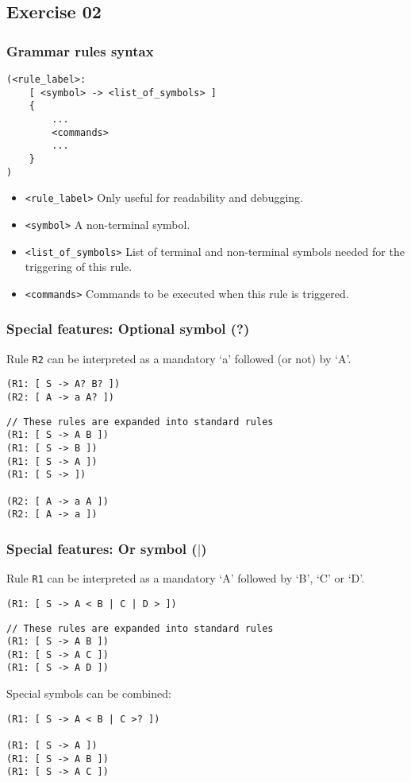 \documentclass[11pt]{beamer}
\begin{document}
\subsection{Exercise 02}

\begin{frame}[fragile]
\frametitle{Grammar rules syntax}
\begin{lstlisting}[language=lekta]
(<rule_label>:
	[ <symbol> -> <list_of_symbols> ]
	{
		...
		<commands>
		...
	}
)
\end{lstlisting}
\pause
\begin{itemize}
	\item \texttt{<rule\_label>} Only useful for readability and debugging.
	\item \texttt{<symbol>} A non-terminal symbol.
	\item \texttt{<list\_of\_symbols>} List of terminal and non-terminal symbols needed for the triggering of this rule.
	\item \texttt{<commands>} Commands to be executed  when this rule is triggered.
\end{itemize}
\end{frame}

\begin{frame}[fragile]
\frametitle{Special features: Optional symbol (?)}
\small
Rule \texttt{R2} can be interpreted as a mandatory `a' followed (or not) by `A'.
\begin{lstlisting}[language=lekta]
(R1: [ S -> A? B? ])
(R2: [ A -> a A? ])
\end{lstlisting}
\pause
\begin{lstlisting}[language=lekta]
// These rules are expanded into standard rules
(R1: [ S -> A B ])
(R1: [ S -> B ])
(R1: [ S -> A ])
(R1: [ S -> ])

(R2: [ A -> a A ])
(R2: [ A -> a ])
\end{lstlisting}
\end{frame}

\begin{frame}[fragile]
\frametitle{Special features: Or symbol ($|$)}
\small
Rule \texttt{R1} can be interpreted as a mandatory `A' followed by `B', `C' or `D'.
\begin{lstlisting}[language=lekta]
(R1: [ S -> A < B | C | D > ])
\end{lstlisting}
\pause
\begin{lstlisting}[language=lekta]
// These rules are expanded into standard rules
(R1: [ S -> A B ])
(R1: [ S -> A C ])
(R1: [ S -> A D ])
\end{lstlisting}
\vspace{15pt}
\pause
Special symbols can be combined:
\begin{lstlisting}[language=lekta]
(R1: [ S -> A < B | C >? ])

(R1: [ S -> A ])
(R1: [ S -> A B ])
(R1: [ S -> A C ])
\end{lstlisting}
\end{frame}
\end{document}
